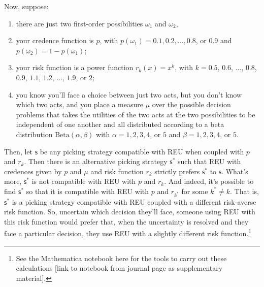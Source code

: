 \documentclass[a4paper]{article}
\newcommand\s{\mathsf{s}}
\newcommand{\todoold}[2][]{\todo[backgroundcolor=white,bordercolor=orange!10,linecolor=gray!10, #1,caption={},textcolor=gray]{Pre-rev: #2}}
\newcommand{\todooldinfo}[2][]{\todoold[#1]{#2}}
\newenvironment{CCM rewritten}
{\begingroup\color{blue}} %
{\endgroup}              %
\begin{document}


Now, suppose:
\begin{enumerate}[label={\normalfont (i)}]
\item there are just two first-order possibilities $\omega_1$ and $\omega_2$,
\item your credence function is $p$, with $p(\omega_1) = 0.1, 0.2, \ldots, 0.8$, or $0.9$ and $p(\omega_2) = 1-p(\omega_1)$;
\item your risk function is a power function $r_k(x) = x^k$, with $k = 0.5$, $0.6$, $\ldots$, $0.8$, $0.9$, $1.1$, $1.2$, $\ldots$, $1.9$, or $2$;
\item you know you'll face a choice between just two acts, but you don't know which two acts, and you place a measure $\mu$ over the possible decision problems that takes the utilities of the two acts at the two possibilities to be independent of one another and all distributed according to a beta distribution $\mathrm{Beta}(\alpha, \beta)$ with $\alpha = 1, 2, 3, 4$, or $5$ and $\beta = 1, 2, 3, 4$, or $5$.\end{enumerate}
Then, let $\s$ be any picking strategy compatible with REU when coupled with $p$ and $r_k$. Then there is an alternative picking strategy $\s^*$ such that REU with credences given by $p$ and $\mu$ and risk function $r_k$ strictly prefers $\s^*$ to $\s$. What's more, $\s^*$ is not compatible with REU with $p$ and $r_k$. And indeed, it's possible to find $\s^*$ so that it is compatible with REU with $p$ and $r_{k^*}$ for some $k^* \neq k$. That is, $\s^*$ is a picking strategy compatible with REU coupled with a different risk-averse risk function. So, uncertain which decision they'll face, someone using REU with this risk function would prefer that, when the uncertainty is resolved and they face a particular decision, they use REU with a slightly different risk function.\footnote{See the Mathematica notebook here for the tools to carry out these calculations [link to notebook from journal page as supplementary material].}%

\end{document}

